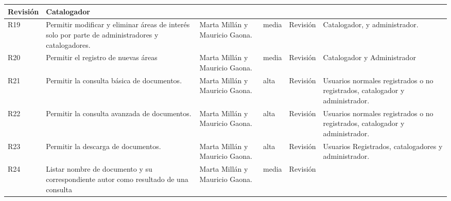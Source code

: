 \begin{center}
\begin{longtable}{|p{0.5cm}|p{3cm}|p{2cm}|p{0.8cm}|p{1.5cm}|p{2cm}|}
Revisión
&	

Catalogador\\
\hline
R19
&	

Permitir modificar y eliminar áreas de interés solo por parte de administradores y catalogadores.
&	

Marta Millán y  Mauricio Gaona.
&	

media
&	

Revisión
&	

Catalogador, y administrador.\\
\hline
R20
	&

Permitir el registro de nuevas áreas
	&	
 Marta Millán y  Mauricio Gaona.

 &
media
	&

Revisión
	&

Catalogador y Administrador\\
					
\hline
R21
	
&
Permitir la consulta básica de documentos.
&	

Marta Millán y Mauricio Gaona.
&	

alta
&	

Revisión
&	

Usuarios normales registrados o no registrados, catalogador y administrador. \\
\hline
R22
&	

Permitir la consulta avanzada de documentos.
&	

Marta Millán y Mauricio Gaona.
&	

alta
&	

Revisión
&	

Usuarios normales registrados o no registrados, catalogador y administrador.\\
\hline

R23
	&

Permitir la descarga de documentos.
	&

Marta Millán y  Mauricio Gaona.
	&

alta
	&

Revisión
	&

Usuarios Registrados, catalogadores y administrador.\\
\hline
R24
	&

Listar nombre de documento y su correspondiente autor como resultado de una consulta
	&

Marta Millán y Mauricio Gaona.
	&

media
	&

Revisión
	&


\end{longtable}
\end{center}

